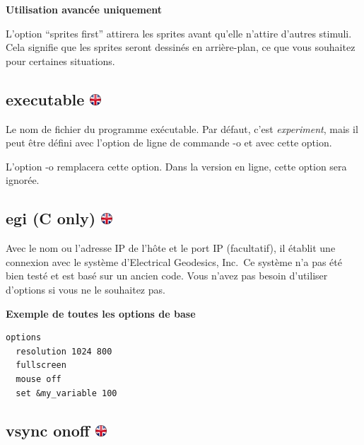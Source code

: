 \documentclass[
]{book}
\begin{document}
\textbf{Utilisation avancée uniquement}

L'option ``sprites first'' attirera les sprites avant qu'elle n'attire d'autres stimuli. Cela signifie que les sprites seront dessinés en arrière-plan, ce que vous souhaitez pour certaines situations.

\hypertarget{executable}{%
\subsection[executable ]{\texorpdfstring{executable \href{https://www.psytoolkit.org/doc3.4.0/syntax.html\#options-executable}{\protect\includegraphics{img/ukflag.png}}}{executable }}\label{executable}}

Le nom de fichier du programme exécutable. Par défaut, c'est \emph{experiment}, mais il peut être défini avec l'option de ligne de commande -o et avec cette option.

L'option -o remplacera cette option. Dans la version en ligne, cette option sera ignorée.

\hypertarget{egi-c-only}{%
\subsection[egi (C only) ]{\texorpdfstring{egi (C only) \href{https://www.psytoolkit.org/doc3.4.0/syntax.html\#options-egi}{\protect\includegraphics{img/ukflag.png}}}{egi (C only) }}\label{egi-c-only}}

Avec le nom ou l'adresse IP de l'hôte et le port IP (facultatif), il établit une connexion avec le système d'Electrical Geodesics, Inc.~Ce système n'a pas été bien testé et est basé sur un ancien code. Vous n'avez pas besoin d'utiliser d'options si vous ne le souhaitez pas.

\textbf{Exemple de toutes les options de base}

\begin{verbatim}
options
  resolution 1024 800
  fullscreen
  mouse off
  set &my_variable 100
\end{verbatim}

\hypertarget{vsync-onoff}{%
\subsection[vsync on\textbar off ]{\texorpdfstring{vsync on\textbar off \href{https://www.psytoolkit.org/doc3.4.0/syntax.html\#options_vsync_off}{\protect\includegraphics{img/ukflag.png}}}{vsync on\textbar off }}\label{vsync-onoff}}
\end{document}
